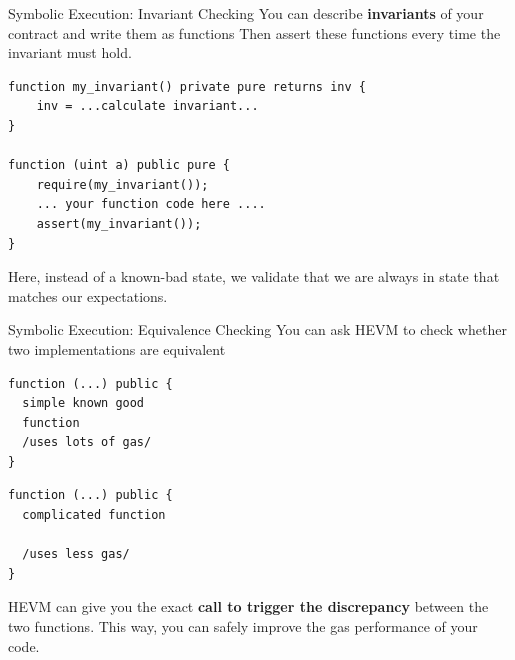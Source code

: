 \documentclass{beamer}
\begin{document}
\begin{frame}[fragile=singleslide]{Symbolic Execution: Invariant Checking}
You can describe \textbf{invariants} of your contract and write them as functions Then assert these functions every time the invariant must hold.
\begin{Verbatim}[frame=single, framerule=0.2mm, framesep=2mm,fontsize=\small]
function my_invariant() private pure returns inv {
	inv = ...calculate invariant...
}
	
function (uint a) public pure {
	require(my_invariant());
	... your function code here ....
	assert(my_invariant());
}
\end{Verbatim}

Here, instead of a known-bad state, we validate that we are always in state that matches our expectations.
\end{frame}	


\begin{frame}[fragile=singleslide]{Symbolic Execution: Equivalence Checking}
You can ask HEVM to check whether two implementations are equivalent
\bigskip
\\

\begin{minipage}[b]{0.45\textwidth}
\begin{Verbatim}[frame=single, framerule=0.2mm, framesep=2mm,fontsize=\small]
function (...) public {
  simple known good
  function
  /uses lots of gas/
}
    \end{Verbatim}
  \end{minipage}
  \begin{minipage}[b]{0.45\textwidth}
  \begin{Verbatim}[frame=single, framerule=0.2mm, framesep=2mm,fontsize=\small]
function (...) public {
  complicated function
  
  /uses less gas/
}
\end{Verbatim}
\end{minipage}

HEVM can give you the exact \textbf{call to trigger the discrepancy} between the two functions. This way, you can safely improve the gas performance of your code.
\end{frame}
\end{document}
